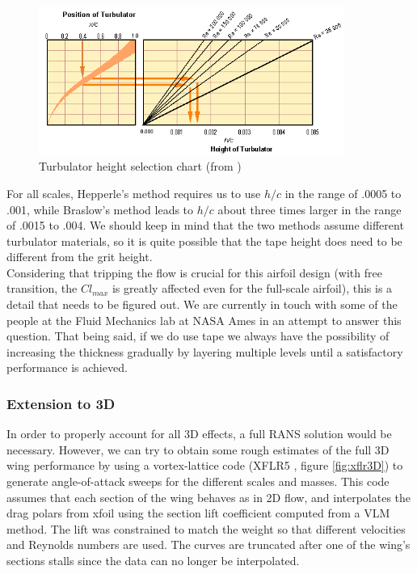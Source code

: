 \documentclass[titlepage,10pt]{article}
\begin{document}
	\begin{figure}[h]
	\begin{center}
	\includegraphics[width=100mm]{turbulator_height.png}
	\end{center}
	\caption{Turbulator height selection chart (from \cite{Hepperle})}
	\label{fig:turbulator}
	\end{figure}

For all scales, Hepperle's method requires us to use $h/c$ in the range of .0005 to .001, while Braslow's method leads to $h/c$ about three times larger in the range of .0015 to .004. We should keep in mind that the two methods assume different turbulator materials, so it is quite possible that the tape height does need to be different from the grit height.\\

Considering that tripping the flow is crucial for this airfoil design (with free transition, the $Cl_{max}$ is greatly affected even for the full-scale airfoil), this is a detail that needs to be figured out. We are currently in touch with some of the people at the Fluid Mechanics lab at NASA Ames in an attempt to answer this question. That being said, if we do use tape we always have the possibility of increasing the thickness gradually by layering multiple levels until a satisfactory performance is achieved.

\newpage
\subsubsection{Extension to 3D}
In order to properly account for all 3D effects, a full RANS solution would be necessary. However, we can try to obtain some rough estimates of the full 3D wing performance by using a vortex-lattice code (XFLR5 \cite{XFLR}, figure \ref{fig:xflr3D}) to generate angle-of-attack sweeps for the different scales and masses. This code assumes that each section of the wing behaves as in 2D flow, and interpolates the drag polars from xfoil using the section lift coefficient computed from a VLM method. The lift was constrained to match the weight so that different velocities and Reynolds numbers are used. The curves are truncated after one of the wing's sections stalls since the data can no longer be interpolated. \\
\end{document}
